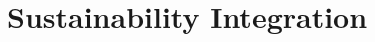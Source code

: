 \documentclass[11pt,a4paper]{report}
\begin{document}
%
%


\section{Sustainability Integration}
\end{document}
